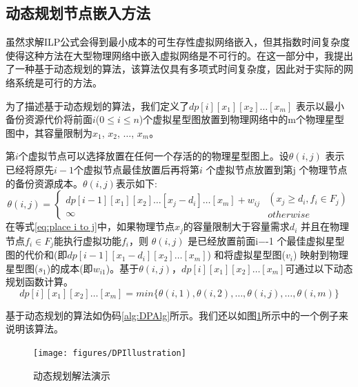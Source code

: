 \subsection{动态规划节点嵌入方法}
\label{lab:DynamicProgrammingEquation}
虽然求解ILP公式会得到最小成本的可生存性虚拟网络嵌入，但其指数时间复杂度使得这种方法在大型物理网络中嵌入虚拟网络是不可行的。在这一部分中，我提出了一种基于动态规划的算法，该算法仅具有多项式时间复杂度，因此对于实际的网络系统是可行的方法。

为了描述基于动态规划的算法，我们定义了$dp[i][{x_1}][{x_2}] \ldots [{x_m}]$ 表示以最小备份资源代价将前面$i$($0 \le i \le n $)个虚拟星型图放置到物理网络中的m个物理星型图中，其容量限制为$ x_1$, $ x_2$, $\ldots$, $x_m$。

第$i$个虚拟节点可以选择放置在任何一个存活的的物理星型图上。设$\theta (i,j)$ 表示已经将原先$i-1$个虚拟节点最佳放置后再将第$i$ 个虚拟节点放置到第j 个物理节点的备份资源成本。$\theta (i,j)$表示如下:
\begin{equation}
\theta (i,j) = \left\{ {\begin{array}{*{20}{c}}
{dp[i - 1][x_1][{x_2}] \ldots [{x_j} - {d_i}] \ldots [{x_m}] + {w_{ij}}}\\
\infty
\end{array}} \right.\begin{array}{*{20}{c}}
{({x_j} \ge {d_i},{f_i} \in {F_j})}\\
{otherwise}
\end{array}
\label{eq:place i to j}
\end{equation}
在等式\ref{eq:place i to j}中，如果物理节点$x_j$的容量限制大于容量需求$d_i$ 并且在物理节点${f_i} \in {F_j}$能执行虚拟功能$f_i$，则 $\theta (i,j)$ 是已经放置前面i−-1 个最佳虚拟星型图的代价和(即$dp[i-1][{x_1} - {d_i}][{x_2}] \ldots [{x_m}]$) 和将虚拟星型图($v_i$) 映射到物理星型图($s_1$)的成本(即$w_{i1}$)。基于$\theta (i,j)$，$dp[i][{x_1}][{x_2}] \ldots [{x_m}]$可通过以下动态规划函数计算。
\begin{equation}
dp[i][{x_1}][{x_2}] \ldots [{x_m}] = min\{\theta (i,1),\theta (i,2),\ldots,\theta (i,j),\ldots,\theta (i,m)\}
\label{eq:update function}
\end{equation}

基于动态规划的算法如伪码\ref{alg:DPAlg}所示。我们还以如图\ref{fig:DPIllustration}所示中的一个例子来说明该算法。


\begin{figure}[htb]
\centering
\texttt{[image: figures/DPIllustration]}\\
  \caption{动态规划解法演示}\label{fig:DPIllustration}
\end{figure}


